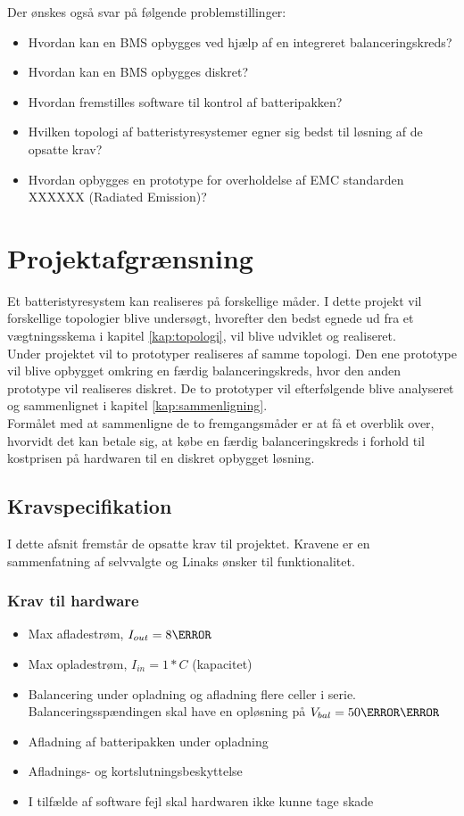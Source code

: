 Der ønskes også svar på følgende problemstillinger: 

\begin{itemize}[noitemsep]
	\item Hvordan kan en BMS opbygges ved hjælp af en integreret balanceringskreds?
	\item Hvordan kan en BMS opbygges diskret? 
	\item Hvordan fremstilles software til kontrol af batteripakken?
	\item Hvilken topologi af batteristyresystemer egner sig bedst til løsning af de opsatte krav?
	\item Hvordan opbygges en prototype for overholdelse af EMC standarden XXXXXX (Radiated Emission)?
\end{itemize}

\section{Projektafgrænsning}
Et batteristyresystem kan realiseres på forskellige måder. I dette projekt vil forskellige topologier blive undersøgt, hvorefter den bedst egnede ud fra et vægtningsskema i kapitel \ref{kap:topologi}, vil blive udviklet og realiseret. 
\\

Under projektet vil to prototyper realiseres af samme topologi. Den ene prototype vil blive opbygget omkring en færdig balanceringskreds, hvor den anden prototype vil realiseres diskret. De to prototyper vil efterfølgende blive analyseret og sammenlignet i kapitel \ref{kap:sammenligning}.
\\

Formålet med at sammenligne de to fremgangsmåder er at få et overblik over, hvorvidt det kan betale sig, at købe en færdig balanceringskreds i forhold til kostprisen på hardwaren til en diskret opbygget løsning.


\subsection{Kravspecifikation} \label{afs:kravspecifikation}
I dette afsnit fremstår de opsatte krav til projektet. Kravene er en sammenfatning af selvvalgte og Linaks ønsker til funktionalitet.

\subsubsection{Krav til hardware}
\begin{itemize}[noitemsep]
	\item Max afladestrøm, $I_{out} = 8\ampere$
	\item Max opladestrøm, $I_{in} = 1*C$ (kapacitet)
	\item Balancering under opladning og afladning flere celler i serie. Balanceringsspændingen skal have en opløsning på  $V_{bal} = 50\milli\volt$
	\item Afladning af batteripakken under opladning
	\item Afladnings- og kortslutningsbeskyttelse
	\item I tilfælde af software fejl skal hardwaren ikke kunne tage skade
\end{itemize}

